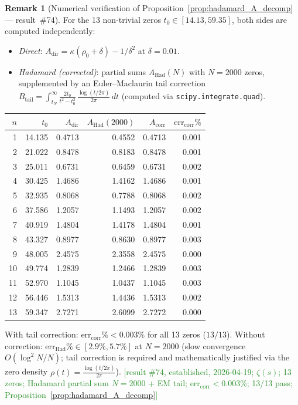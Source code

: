 \documentclass[11pt, a4paper]{article}
\theoremstyle{definition}
\newtheorem{remark}{Remark}[section]
\theoremstyle{plain}
\begin{document}
\begin{remark}[Numerical verification of Proposition~\ref{prop:hadamard_A_decomp} --- result~\#74]
\label{rem:hadamard_A_numerical}
For the 13 non-trivial zeros $t_0 \in [14.13, 59.35]$, both sides are computed
independently:
\begin{itemize}
  \item \emph{Direct}: $A_{\mathrm{dir}} = \kappa(\rho_0+\delta)-1/\delta^2$ at $\delta=0.01$.
  \item \emph{Hadamard (corrected)}: partial sums $A_{\mathrm{Had}}(N)$ with $N=2000$ zeros,
    supplemented by an Euler--Maclaurin tail correction
    $B_{\mathrm{tail}} = \int_{t_N}^\infty \tfrac{2t_0}{t^2-t_0^2}\,\tfrac{\log(t/2\pi)}{2\pi}\,dt$
    (computed via \texttt{scipy.integrate.quad}).
\end{itemize}
\smallskip
\begin{center}
\small
\begin{tabular}{@{}rrrrrr@{}}
\toprule
$n$ & $t_0$ & $A_{\mathrm{dir}}$ & $A_{\mathrm{Had}}(2000)$ & $A_{\mathrm{corr}}$ & $\mathrm{err}_{\mathrm{corr}}\%$ \\
\midrule
 1 & 14.135 & 0.4713 & 0.4552 & 0.4713 & 0.001 \\
 2 & 21.022 & 0.8478 & 0.8183 & 0.8478 & 0.001 \\
 3 & 25.011 & 0.6731 & 0.6459 & 0.6731 & 0.002 \\
 4 & 30.425 & 1.4686 & 1.4162 & 1.4686 & 0.001 \\
 5 & 32.935 & 0.8068 & 0.7788 & 0.8068 & 0.002 \\
 6 & 37.586 & 1.2057 & 1.1493 & 1.2057 & 0.002 \\
 7 & 40.919 & 1.4804 & 1.4178 & 1.4804 & 0.001 \\
 8 & 43.327 & 0.8977 & 0.8630 & 0.8977 & 0.003 \\
 9 & 48.005 & 2.4575 & 2.3558 & 2.4575 & 0.000 \\
10 & 49.774 & 1.2839 & 1.2466 & 1.2839 & 0.003 \\
11 & 52.970 & 1.1045 & 1.0437 & 1.1045 & 0.003 \\
12 & 56.446 & 1.5313 & 1.4436 & 1.5313 & 0.002 \\
13 & 59.347 & 2.7271 & 2.6099 & 2.7272 & 0.000 \\
\bottomrule
\end{tabular}
\end{center}
\smallskip\noindent
With tail correction: $\mathrm{err}_{\mathrm{corr}}\% < 0.003\%$ for all 13 zeros ($13/13$).
Without correction: $\mathrm{err}_{\mathrm{Had}}\% \in [2.9\%, 5.7\%]$ at $N{=}2000$
(slow convergence $O(\log^2 N/N)$; tail correction is required and mathematically justified
via the zero density $\rho(t) = \tfrac{\log(t/2\pi)}{2\pi}$).
\textcolor{ForestGreen}{[result \#74, established, 2026-04-19; $\zeta(s)$; 13 zeros; Hadamard partial sum $N{=}2000$ + EM tail; $\mathrm{err}_{\mathrm{corr}}{<}0.003\%$; 13/13 pass; Proposition~\ref{prop:hadamard_A_decomp}]}
\end{remark}
\end{document}
